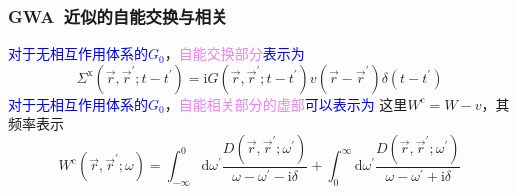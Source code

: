 \documentclass[cjk,slidestop,compress,mathserif,blue]{beamer}
\begin{document}
\frame
{
	\frametitle{\textrm{GWA~}近似的自能交换与相关}
			\textcolor{blue}{对于无相互作用体系的$G_0$}，\textcolor{violet}{自能交换部分}\textcolor{blue}{表示为}
			\begin{displaymath}
				\Sigma^{\mathrm{x}}(\vec r,\vec r^{\prime};t-t^{\prime})=\mathrm{i}G(\vec r,\vec r^{\prime};t-t^{\prime})v(\vec r-\vec r^{\prime})\delta(t-t^{\prime})
			\end{displaymath}
			\textcolor{blue}{对于无相互作用体系的$G_0$}，\textcolor{violet}{自能相关部分的虚部}\textcolor{blue}{可以表示为}
	\fontsize{9pt}{6.2pt}
			这里$W^{\mathrm{c}}=W-v$，其频率表示
			\begin{displaymath}
				W^{\mathrm{c}}(\vec r,\vec r^{\prime};\omega)=\int_{-\infty}^0\mathrm{d}\omega^{\prime}\frac{D(\vec r,\vec r^{\prime};\omega^{\prime})}{\omega-\omega^{\prime}-\mathrm{i}\delta}+\int_0^{\infty}\mathrm{d}\omega^{\prime}\frac{D(\vec r,\vec r^{\prime};\omega^{\prime})}{\omega-\omega^{\prime}+\mathrm{i}\delta}
			\end{displaymath}
}
\end{document}
